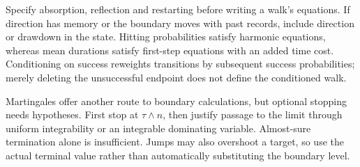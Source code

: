 Specify absorption, reflection and restarting before writing a walk's equations. If direction has memory or the boundary moves with past records, include direction or drawdown in the state. Hitting probabilities satisfy harmonic equations, whereas mean durations satisfy first-step equations with an added time cost. Conditioning on success reweights transitions by subsequent success probabilities; merely deleting the unsuccessful endpoint does not define the conditioned walk.

Martingales offer another route to boundary calculations, but optional stopping needs hypotheses. First stop at $\tau\wedge n$, then justify passage to the limit through uniform integrability or an integrable dominating variable. Almost-sure termination alone is insufficient. Jumps may also overshoot a target, so use the actual terminal value rather than automatically substituting the boundary level.
\par\smallskip
